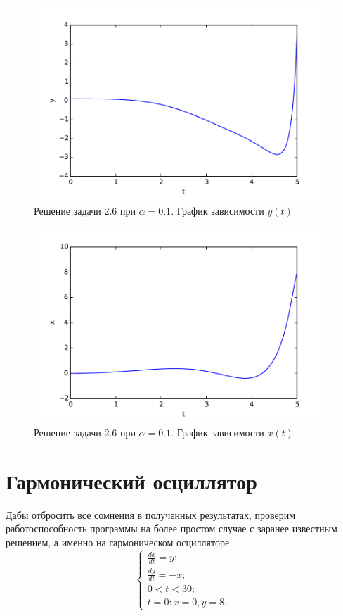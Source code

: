 \documentclass[a4paper,14pt]{article}
\begin{document}
\begin{figure}[H]
\centering
    \includegraphics[width=110mm]{pictures/01t-y.pdf}
    \caption{Решение задачи 2.6 при $\alpha = 0.1$. График зависимости $y(t)$}
    \label{1myt-y} 
\end{figure}
\begin{figure}[H]
\centering
    \includegraphics[width=110mm]{pictures/01t-x.pdf}
    \caption{Решение задачи 2.6 при $\alpha = 0.1$. График зависимости $x(t)$}
    \label{1myt-x}
\end{figure}

\section{Гармонический осциллятор}
Дабы отбросить все сомнения в полученных результатах, проверим работоспособность программы на более простом случае с заранее известным решением, а именно на гармоническом осцилляторе
\[
\begin{cases}
	\frac{d x}{d t} = y;\\
	\frac{d y}{d t} = -x;\\
	0 < t < 30; \\
	t = 0: x = 0, y = 8.
\end{cases}
\]
\end{document}
